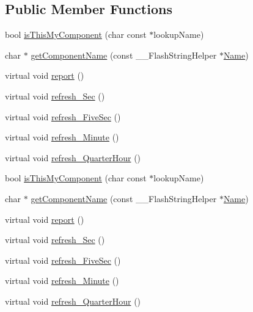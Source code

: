\subsection*{Public Member Functions}
\begin{DoxyCompactItemize}
\item 
bool \hyperlink{class_common_a0192d295366bf1e966d8b58a3ce57554}{is\+This\+My\+Component} (char const $\ast$lookup\+Name)
\item 
char $\ast$ \hyperlink{class_common_a86553d0d8ffabfd97236aa54ca2ba8f1}{get\+Component\+Name} (const \+\_\+\+\_\+\+Flash\+String\+Helper $\ast$\hyperlink{class_common_aeea91a726dbe988e515057b32ba0726f}{Name})
\item 
virtual void \hyperlink{class_common_a9e60e2c26a5f4d72342a59a969954636}{report} ()
\item 
virtual void \hyperlink{class_common_acd1fdd47fbf8bb490f5c6d3ab6cd8d05}{refresh\+\_\+\+Sec} ()
\item 
virtual void \hyperlink{class_common_a604ab36b3a1d9a5bcfcb225149c82f90}{refresh\+\_\+\+Five\+Sec} ()
\item 
virtual void \hyperlink{class_common_a14e4462a94bd118028ce1d487ca0292c}{refresh\+\_\+\+Minute} ()
\item 
virtual void \hyperlink{class_common_aa7222229739c89d441fadd6a40deff89}{refresh\+\_\+\+Quarter\+Hour} ()
\item 
bool \hyperlink{class_common_a0192d295366bf1e966d8b58a3ce57554}{is\+This\+My\+Component} (char const $\ast$lookup\+Name)
\item 
char $\ast$ \hyperlink{class_common_a096e52124ab651d6e9b6fab9f13e11a8}{get\+Component\+Name} (const \+\_\+\+\_\+\+Flash\+String\+Helper $\ast$\hyperlink{class_common_aeea91a726dbe988e515057b32ba0726f}{Name})
\item 
virtual void \hyperlink{class_common_a3fccb7776a84e0faf4a7f5a3af615b36}{report} ()
\item 
virtual void \hyperlink{class_common_aa7add0429096fbb9059a341e677d7a32}{refresh\+\_\+\+Sec} ()
\item 
virtual void \hyperlink{class_common_adeb42683b28c16201527f5e2f4083922}{refresh\+\_\+\+Five\+Sec} ()
\item 
virtual void \hyperlink{class_common_a780db297fec9aca2c60ee5d61b56d9e1}{refresh\+\_\+\+Minute} ()
\item 
virtual void \hyperlink{class_common_ad6c67e87cbd932e3b86ee656c1b540a7}{refresh\+\_\+\+Quarter\+Hour} ()
\end{DoxyCompactItemize}
